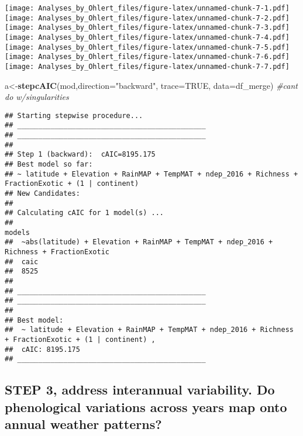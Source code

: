 \documentclass[
]{article}
\newenvironment{Shaded}{\begin{snugshade}}{\end{snugshade}}
\newcommand{\CommentTok}[1]{\textcolor[rgb]{0.56,0.35,0.01}{\textit{#1}}}
\newcommand{\DataTypeTok}[1]{\textcolor[rgb]{0.13,0.29,0.53}{#1}}
\newcommand{\KeywordTok}[1]{\textcolor[rgb]{0.13,0.29,0.53}{\textbf{#1}}}
\newcommand{\NormalTok}[1]{#1}
\newcommand{\OtherTok}[1]{\textcolor[rgb]{0.56,0.35,0.01}{#1}}
\newcommand{\StringTok}[1]{\textcolor[rgb]{0.31,0.60,0.02}{#1}}
\begin{document}
\texttt{[image: Analyses\_by\_Ohlert\_files/figure-latex/unnamed-chunk-7-1.pdf]}
\texttt{[image: Analyses\_by\_Ohlert\_files/figure-latex/unnamed-chunk-7-2.pdf]}
\texttt{[image: Analyses\_by\_Ohlert\_files/figure-latex/unnamed-chunk-7-3.pdf]}
\texttt{[image: Analyses\_by\_Ohlert\_files/figure-latex/unnamed-chunk-7-4.pdf]}
\texttt{[image: Analyses\_by\_Ohlert\_files/figure-latex/unnamed-chunk-7-5.pdf]}
\texttt{[image: Analyses\_by\_Ohlert\_files/figure-latex/unnamed-chunk-7-6.pdf]}
\texttt{[image: Analyses\_by\_Ohlert\_files/figure-latex/unnamed-chunk-7-7.pdf]}

\begin{Shaded}
\begin{Highlighting}[]
\NormalTok{a<-}\KeywordTok{stepcAIC}\NormalTok{(mod,}\DataTypeTok{direction=}\StringTok{"backward"}\NormalTok{, }\DataTypeTok{trace=}\OtherTok{TRUE}\NormalTok{, }\DataTypeTok{data=}\NormalTok{df_merge) }\CommentTok{#cant do w/singularities}
\end{Highlighting}
\end{Shaded}

\begin{verbatim}
## Starting stepwise procedure...
## _____________________________________________
## _____________________________________________
## 
## Step 1 (backward):  cAIC=8195.175
## Best model so far:
## ~ latitude + Elevation + RainMAP + TempMAT + ndep_2016 + Richness + FractionExotic + (1 | continent)
## New Candidates:
## 
## Calculating cAIC for 1 model(s) ...
##                                                                                       models
##  ~abs(latitude) + Elevation + RainMAP + TempMAT + ndep_2016 +      Richness + FractionExotic
##  caic
##  8525
## 
## _____________________________________________
## _____________________________________________
## 
## Best model:
##  ~ latitude + Elevation + RainMAP + TempMAT + ndep_2016 + Richness + FractionExotic + (1 | continent) ,
##  cAIC: 8195.175 
## _____________________________________________
\end{verbatim}

\hypertarget{step-3-address-interannual-variability.-do-phenological-variations-across-years-map-onto-annual-weather-patterns}{%
\subsection{STEP 3, address interannual variability. Do phenological
variations across years map onto annual weather
patterns?}\label{step-3-address-interannual-variability.-do-phenological-variations-across-years-map-onto-annual-weather-patterns}}
\end{document}
